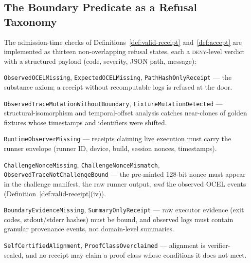 \subsection{The Boundary Predicate as a Refusal Taxonomy}
\label{sec:impl-refusals}

The admission-time checks of Definitions~\ref{def:valid-receipt}
and~\ref{def:accept} are implemented as thirteen non-overlapping refusal
states, each a \textsc{deny}-level verdict with a structured payload (code,
severity, JSON path, message):

\begin{description}[leftmargin=1.6em,itemsep=1pt]
  \item[Ingress validation:] \texttt{Observed\-OCEL\-Missing},
        \texttt{Expected\-OCEL\-Missing}, \texttt{Path\-Hash\-Only\-Receipt}
        --- the substance axiom; a receipt without recomputable logs is
        refused at the door.
  \item[Adversarial detection:]
        \texttt{Observed\-Trace\-Mutation\-Without\-Boundary},
        \texttt{Fixture\-Mutation\-Detected} --- structural-isomorphism and
        temporal-offset analysis catches near-clones of golden fixtures whose
        timestamps and identifiers were shifted.
  \item[Envelope verification:] \texttt{RuntimeObserverMissing} --- receipts
        claiming live execution must carry the runner envelope (runner ID,
        device, build, session nonces, timestamps).
  \item[Cryptographic binding:] \texttt{Challenge\-Nonce\-Missing},
        \texttt{Challenge\-Nonce\-Mismatch},
        \texttt{Observed\-Trace\-Not\-Challenge\-Bound}
        --- the pre-minted 128-bit nonce must appear in the challenge manifest,
        the raw runner output, \emph{and} the observed OCEL events
        (Definition~\ref{def:valid-receipt}(iv)).
  \item[Evidence binding:] \texttt{BoundaryEvidenceMissing},
        \texttt{SummaryOnlyReceipt} --- raw executor evidence (exit codes,
        stdout/stderr hashes) must be bound, and observed logs must contain
        granular provenance events, not domain-level summaries.
  \item[Authority \& hierarchy:] \texttt{SelfCertifiedAlignment},
        \texttt{ProofClassOverclaimed} --- alignment is verifier-sealed, and no
        receipt may claim a proof class whose conditions it does not meet.
\end{description}

